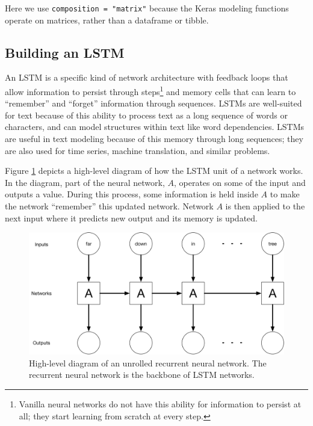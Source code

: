 \documentclass[
]{krantz}
\begin{document}
Here we use \texttt{composition\ =\ "matrix"} because the Keras modeling functions operate on matrices, rather than a dataframe or tibble.

\hypertarget{building-an-lstm}{%
\subsection{Building an LSTM}\label{building-an-lstm}}

An LSTM is a specific kind of network architecture with feedback loops that allow information to persist through steps\footnote{Vanilla neural networks do not have this ability for information to persist at all; they start learning from scratch at every step.} and memory cells that can learn to ``remember'' and ``forget'' information through sequences. LSTMs are well-suited for text because of this ability to process text as a long sequence of words or characters, and can model structures within text like word dependencies. LSTMs are useful in text modeling because of this memory through long sequences; they are also used for time series, machine translation, and similar problems.

Figure \ref{fig:rnndiag} depicts a high-level diagram of how the LSTM unit of a network works. In the diagram, part of the neural network, \(A\), operates on some of the input and outputs a value. During this process, some information is held inside \(A\) to make the network ``remember'' this updated network. Network \(A\) is then applied to the next input where it predicts new output and its memory is updated.


\begin{figure}

{\centering \includegraphics[width=0.9\linewidth]{diagram-files/rnn-architecture} 

}

\caption{High-level diagram of an unrolled recurrent neural network. The recurrent neural network is the backbone of LSTM networks.}\label{fig:rnndiag}
\end{figure}
\end{document}
